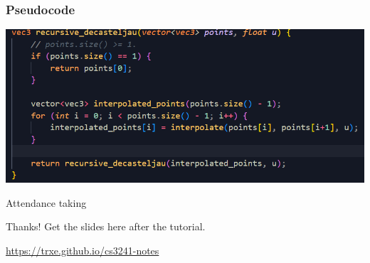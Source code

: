 \documentclass{beamer}
\begin{document}
\begin{frame}
    \frametitle{Pseudocode}

    \begin{center}
        \includegraphics[scale=0.7]{q9-pseudocode.png}
    \end{center}

\end{frame}

\begin{frame}
    \AlegreyaExtraBold \LARGE
    Attendance taking
\end{frame}

\ThankYou
\begin{frame}
    Thanks! Get the slides here after the tutorial.\\
    \vspace{2em}
    \scalebox{3}{\faGithub}\par\bigskip
    \url{https://trxe.github.io/cs3241-notes}
\end{frame}
\end{document}
